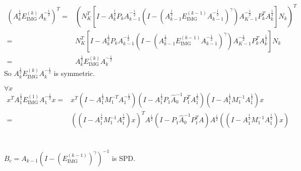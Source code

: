 \documentclass{article}
\begin{document}
\begin{equation*}
    \begin{aligned}
        (A_k^{\frac{1}{2}}E_\text{IMG}^{(k)}A_k^{-\frac{1}{2}})^T= & (N_K^T[I-A_k^{\frac{1}{2}}P_kA_{k-1}^{-\frac{1}{2}}(I-(A_{k-1}^{\frac{1}{2}}E_\text{IMG}^{(k-1)}A_{k-1}^{-\frac{1}{2}})^\gamma)A_{K-1}^{-\frac{1}{2}}P_k^TA_k^{\frac{1}{2}}]N_k)^T \\
        =                                                          & N_K^T[I-A_k^{\frac{1}{2}}P_kA_{k-1}^{-\frac{1}{2}}(I-(A_{k-1}^{\frac{1}{2}}E_\text{IMG}^{(k-1)}A_{k-1}^{-\frac{1}{2}})^\gamma)A_{K-1}^{-\frac{1}{2}}P_k^TA_k^{\frac{1}{2}}]N_k     \\
        =                                                          & A_k^{\frac{1}{2}}E_\text{IMG}^{(k)}A_k^{-\frac{1}{2}}
    \end{aligned}
\end{equation*}
So $A_k^{\frac{1}{2}}E_\text{IMG}^{(k)}A_k^{-\frac{1}{2}}$ is symmetric.

$\forall x$
\begin{equation*}
    \begin{aligned}
        x^TA_1^{\frac{1}{2}}E_\text{IMG}^{(1)}A_1^{-\frac{1}{2}}x= & x^T (I-A_1^{\frac{1}{2}}M_1^{-T}A_1^{-\frac{1}{2}})(I-A_1^{\frac{1}{2}}P_1\hat{A}_0^{-1}P_1^TA_1^{ \frac{1}{2}})(I-A_1^{\frac{1}{2}}M_1^{-1}A_1^{\frac{1}{2}}) x  \\
        =                                                          & ((I-A_1^{\frac{1}{2}}M_1^{-1}A_1^{\frac{1}{2}}) x )^TA^{\frac{1}{2}}(I-P_1\hat{A}_0^{-1}P_1^TA)A^{\frac{1}{2}}((I-A_1^{\frac{1}{2}}M_1^{-1}A_1^{\frac{1}{2}}) x )
    \end{aligned}
\end{equation*}

\section{}
$B_c=A_{k-1}(I-(E_\text{IMG}^{(k-1)})^\gamma)^{-1}$ is SPD.
\end{document}
